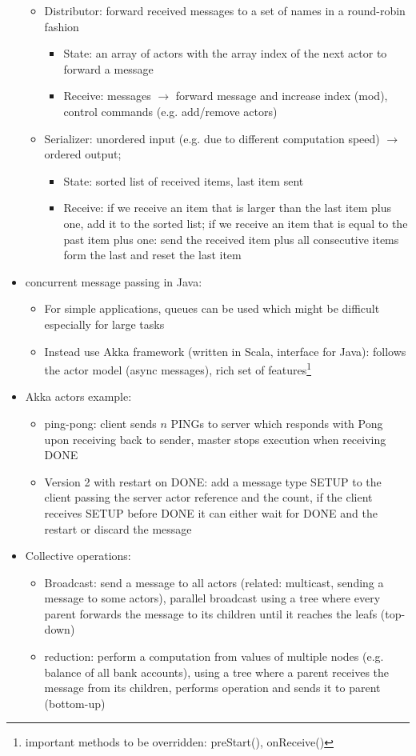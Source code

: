 \documentclass[a4paper]{article}
\begin{document}
\begin{itemize}
\begin{itemize}
\item Distributor: forward received messages to a set of names in a round-robin fashion
\begin{itemize}
\item State: an array of actors with the array index of the next actor to forward a message
\item Receive: messages $\rightarrow$ forward message and increase index (mod), control commands (e.g. add/remove actors)
\end{itemize}
\item Serializer: unordered input (e.g. due to different computation speed) $\rightarrow$ ordered output; 
\begin{itemize}
\item State: sorted list of received items, last item sent
\item Receive: if we receive an item that is larger than the last item plus one, add it to the sorted list; if we receive an item that is equal to the past item plus one: send the received item plus all consecutive items form the last and reset the last item
\end{itemize}
\end{itemize}
\item concurrent message passing in Java: 
\begin{itemize}
\item For simple applications, queues can be used which might be difficult especially for large tasks
\item Instead use Akka framework (written in Scala, interface for Java): follows the actor model (async messages), rich set of features\footnote{important methods to be overridden: preStart(), onReceive()} 
\end{itemize}

\item Akka actors example: 
\begin{itemize}
\item ping-pong: client sends $n$ PINGs to server which responds with Pong upon receiving back to sender, master stops execution when receiving DONE
\item Version 2 with restart on DONE: add a message type SETUP to the client passing the server actor reference and the count, if the client receives SETUP before DONE it can either wait for DONE and the restart or discard the message
\end{itemize}
\item Collective operations: 
\begin{itemize}
\item Broadcast: send a message to all actors (related: multicast, sending a message to some actors), parallel broadcast using a tree where every parent forwards the message to its children until it reaches the leafs (top-down)
\item reduction: perform a computation from values of multiple nodes (e.g. balance of all bank accounts), using a tree where a parent receives the message from its children, performs operation and sends it to parent (bottom-up)
\end{itemize}
\end{itemize}
\end{document}
